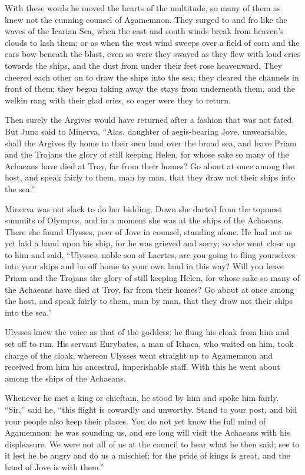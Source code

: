 With these words he moved the hearts of the multitude, so many of them as
knew not the cunning counsel of Agamemnon. They surged to and fro like the
waves of the Icarian Sea, when the east and south winds break from
heaven’s clouds to lash them; or as when the west wind sweeps over a field
of corn and the ears bow beneath the blast, even so were they swayed as
they flew with loud cries towards the ships, and the dust from under their
feet rose heavenward. They cheered each other on to draw the ships into
the sea; they cleared the channels in front of them; they began taking
away the stays from underneath them, and the welkin rang with their glad
cries, so eager were they to return.

Then surely the Argives would have returned after a fashion that was not
fated. But Juno said to Minerva, “Alas, daughter of aegis-bearing Jove,
unweariable, shall the Argives fly home to their own land over the broad
sea, and leave Priam and the Trojans the glory of still keeping Helen, for
whose sake so many of the Achaeans have died at Troy, far from their
homes? Go about at once among the host, and speak fairly to them, man by
man, that they draw not their ships into the sea.”

Minerva was not slack to do her bidding. Down she darted from the topmost
summits of Olympus, and in a moment she was at the ships of the Achaeans.
There she found Ulysses, peer of Jove in counsel, standing alone. He had
not as yet laid a hand upon his ship, for he was grieved and sorry; so she
went close up to him and said, “Ulysses, noble son of Laertes, are you
going to fling yourselves into your ships and be off home to your own land
in this way? Will you leave Priam and the Trojans the glory of still
keeping Helen, for whose sake so many of the Achaeans have died at Troy,
far from their homes? Go about at once among the host, and speak fairly to
them, man by man, that they draw not their ships into the sea.”

Ulysses knew the voice as that of the goddess: he flung his cloak from him
and set off to run. His servant Eurybates, a man of Ithaca, who waited on
him, took charge of the cloak, whereon Ulysses went straight up to
Agamemnon and received from him his ancestral, imperishable staff. With
this he went about among the ships of the Achaeans.

Whenever he met a king or chieftain, he stood by him and spoke him fairly.
“Sir,” said he, “this flight is cowardly and unworthy. Stand to your post,
and bid your people also keep their places. You do not yet know the full
mind of Agamemnon; he was sounding us, and ere long will visit the
Achaeans with his displeasure. We were not all of us at the council to
hear what he then said; see to it lest he be angry and do us a mischief;
for the pride of kings is great, and the hand of Jove is with them.”

